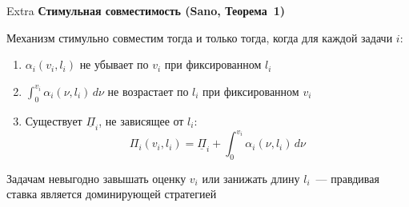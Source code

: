 \documentclass[aspectratio=169]{beamer}
\begin{document}
\begin{frame}{Extra}
        \textbf{Стимульная совместимость (Sano, Теорема~1)}

        \vspace{0.2cm}
        Механизм стимульно совместим тогда и только тогда, когда
        для каждой задачи $i$:

        \begin{enumerate}
                \item $\alpha_i(v_i, l_i)$ не убывает по $v_i$
                        при фиксированном $l_i$
                \item $\int_0^{v_i} \alpha_i(\nu, l_i)\,d\nu$ не возрастает
                        по $l_i$ при фиксированном $v_i$
                \item Существует $\underline{\Pi}_i$, не зависящее от $l_i$:
                        $$\Pi_i(v_i, l_i) = \underline{\Pi}_i +
                        \int_0^{v_i} \alpha_i(\nu, l_i)\,d\nu$$
        \end{enumerate}

        \vspace{0.1cm}
        \begin{shadowbox}
                \footnotesize Задачам невыгодно завышать оценку $v_i$
                или занижать длину $l_i$~--- правдивая ставка
                является доминирующей стратегией
        \end{shadowbox}
\end{frame}
\addtocounter{framenumber}{-1}
\end{document}
